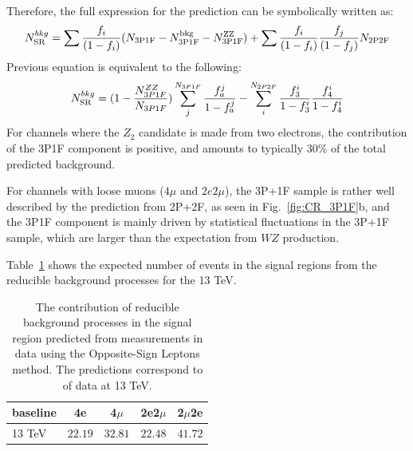 Therefore, the
full expression for the prediction can be symbolically written as:
%
\begin{equation} 
\label{eq:PredictionSR}
N^{bkg}_{\rm SR} = \sum \frac{f_{i}}{(1-f_{i})} (N_{\rm 3P1F} - N^{\rm
bkg}_{\rm 3P1F} - N^{\rm ZZ}_{\rm 3P1F})
+ \sum \frac{f_{i}}{(1-f_{i})} \frac{f_{j}}{(1-f_{j})}N_{\rm 2P2F} \end{equation}
Previous equation is equivalent to the following:
\begin{equation}
\label{eq:PredictionSR2}
N^{bkg}_{\rm SR}= (1-\frac{N_{3P1F}^{ZZ}}{N_{3P1F}})\sum_j^{N_{3P1F}}\frac{f_a^j}{1-f_a^j} - \sum_i^{N_{2P2F}}\frac{f_3^i}{1-f_3^i}\frac{f_4^i}{1-f_4^i}
\end{equation}
For channels where the $Z_2$ candidate is made from two electrons, 
the contribution of the 3P1F component is 
positive, and amounts to typically $30 \%$ of the total predicted background.

For channels with loose muons ($4\mu$ and $2e2\mu$), the 3P+1F sample is rather well described by
the prediction from 2P+2F, as seen in Fig.~\ref{fig:CR_3P1F}b, and the
3P1F component is mainly driven by statistical fluctuations in the 3P+1F sample,
which are larger than the expectation from $WZ$ production.


Table~\ref{tab:reducibleMethodA} shows the expected number of
events in the signal regions from the reducible background processes for the 13 TeV. 

\begin{table}[h]
\begin{center}
     \begin{tabular}{| l | c | c | c | c |} \hline
 baseline	& 4e 	 & 4$\mu$ & 2e2$\mu$  & 2$\mu$2e   \\ \hline \hline
 13 TeV		& $22.19$ & $32.81$ & $22.48$    & $41.72$  \\  \hline
 	\end{tabular}
\end{center}
    \caption{ The contribution of reducible background
    processes in the signal region predicted from measurements in data
    using the Opposite-Sign Leptons method. The predictions correspond to \usedLumi of data at 13 TeV.}
     \label{tab:reducibleMethodA}
\end{table}
